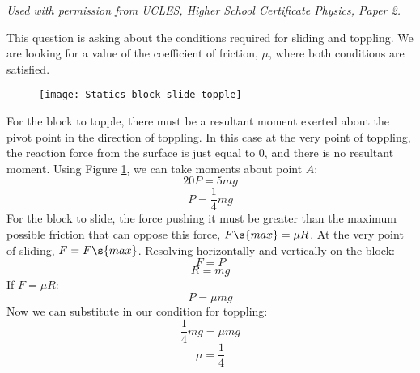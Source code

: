 
\begin{problem}
 {}
{\textit{Used with permission from UCLES, Higher School Certificate Physics, Paper 2.}} %
{
This question is asking about the conditions required for sliding and toppling. We are looking for a value of the coefficient of friction, $\mu$, where both conditions are satisfied.

\begin{figure}
	\centering
	\texttt{[image: Statics\_block\_slide\_topple]}
	\caption{}
	\label{fig:Statics_block_slide_topple}
\end{figure}

\nl
For the block to topple, there must be a resultant moment exerted about the pivot point in the direction of toppling. In this case at the very point of toppling, the reaction force from the surface is just equal to 0, and there is no resultant moment. Using Figure \ref{fig:Statics_block_slide_topple}, we can take moments about point $A$:
\begin{equation*}	
20P = 5mg	
\end{equation*}
\begin{equation*}	
P = \frac{1}{4}mg 	
\end{equation*}
For the block to slide, the force pushing it must be greater than the maximum possible friction that can oppose this force, $F\s{max} = \mu R$. At the very point of sliding, $F = F\s{max}$. Resolving horizontally and vertically on the block:
\begin{equation*}	
F = P 	
\end{equation*}
\begin{equation*}	
R = mg	
\end{equation*}
If $F = \mu R$:
\begin{equation*}
 P = \mu mg	
 \end{equation*}
Now we can substitute in our condition for toppling:
\begin{equation*}	
\frac{1}{4}mg = \mu mg	
\end{equation*}
\begin{equation*}	
\mu = \frac{1}{4}	
\end{equation*}
}
\end{problem}